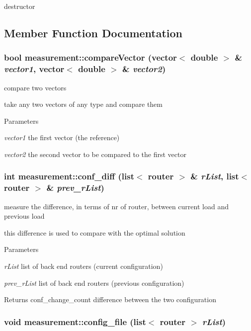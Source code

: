 destructor 



\subsection{Member Function Documentation}
\hypertarget{classmeasurement_abd3271afad2207cd5db4de16edbf59a3}{
\subsubsection[{compareVector}]{\setlength{\rightskip}{0pt plus 5cm}bool measurement::compareVector (vector$<$ double $>$ \& {\em vector1}, \/  vector$<$ double $>$ \& {\em vector2})}}
\label{classmeasurement_abd3271afad2207cd5db4de16edbf59a3}


compare two vectors 

take any two vectors of any type and compare them 
\begin{DoxyParams}{Parameters}
\item[{\em vector1}]the first vector (the reference) \item[{\em vector2}]the second vector to be compared to the first vector \end{DoxyParams}
\hypertarget{classmeasurement_a4126bd87377bb02f30d9f81f3d36304c}{
\subsubsection[{conf\_\-diff}]{\setlength{\rightskip}{0pt plus 5cm}int measurement::conf\_\-diff (list$<$ {\bf router} $>$ \& {\em rList}, \/  list$<$ {\bf router} $>$ \& {\em prev\_\-rList})}}
\label{classmeasurement_a4126bd87377bb02f30d9f81f3d36304c}


measure the difference, in terms of nr of router, between current load and previous load 

this difference is used to compare with the optimal solution 
\begin{DoxyParams}{Parameters}
\item[{\em rList}]list of back end routers (current configuration) \item[{\em prev\_\-rList}]list of back end routers (previous configuration) \end{DoxyParams}
\begin{DoxyReturn}{Returns}
conf\_\-change\_\-count difference between the two configuration 
\end{DoxyReturn}
\hypertarget{classmeasurement_a10e7afbdd82e2fed30bd9e7a8725a3bc}{
\subsubsection[{config\_\-file}]{\setlength{\rightskip}{0pt plus 5cm}void measurement::config\_\-file (list$<$ {\bf router} $>$ {\em rList})}}
\label{classmeasurement_a10e7afbdd82e2fed30bd9e7a8725a3bc}


